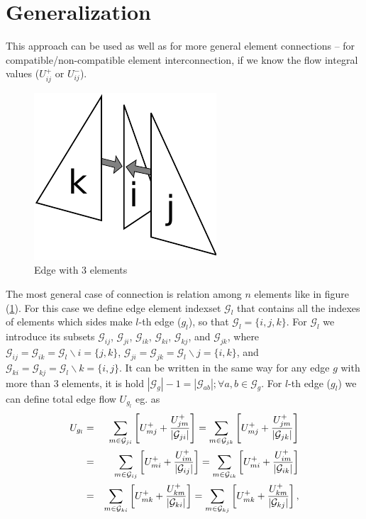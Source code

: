  \section*{Generalization}
  This approach can be used as well as for more general element connections -- for compatible/non-compatible element interconnection, if we know the flow integral
  values ($U_{ij}^{+}$ or $U_{ij}^{-}$). %
      \begin{figure}[h]
        \begin{center}
        \includegraphics[scale=0.7]{obr7.pdf} 
	\caption{Edge with 3 elements}
	\label{edgemodel}
        \end{center}
      \end{figure}  
  The most general case of connection is relation among $n$ elements like in figure (\ref{edgemodel}). For this case we define
edge element indexset $\mathcal{G}_{l}$ that contains all the indexes of elements which sides make $l$-th edge ($g_l$), so that $\mathcal{G}_{l} = \{i,j,k\}$.
For $\mathcal{G}_{l}$ we introduce its subsets $\mathcal{G}_{ij}$, $\mathcal{G}_{ji}$, $\mathcal{G}_{ik}$, $\mathcal{G}_{ki}$, $\mathcal{G}_{kj}$, and $\mathcal{G}_{jk}$,
  where $\mathcal{G}_{ij} = \mathcal{G}_{ik} =  \mathcal{G}_{l} \backslash {i} = \{j,k\}$, $ \mathcal{G}_{ji} = \mathcal{G}_{jk} = \mathcal{G}_{l} \backslash {j} =\{i,k\}$, and
 $\mathcal{G}_{ki} = \mathcal{G}_{kj} = \mathcal{G}_{l} \backslash {k} =\{i,j\}$. It can be written in the same way for any edge $g$ with more than 3 elements, 
it is hold  $|\mathcal{G}_{g}| - 1 = |\mathcal{G}_{ab}|; \forall a,b \in \mathcal{G}_{g}$.
For $l$-th edge ($g_l$) we can define total edge flow $U_{g_{l}}$ eg. as
  \begin{eqnarray}
   U_{g_{l}} &=& \sum\limits_{m \in \mathcal{G}_{ji}}   \left[ U_{mj}^{+}   + \frac{ U_{jm}^{+}}{|\mathcal{G}_{ji}|} \right] = \sum\limits_{m \in \mathcal{G}_{jk}}  \left[ U_{mj}^{+}   +  \frac{ U_{jm}^{+}}{|\mathcal{G}_{jk}|} \right] \notag \\
	      &=& \sum\limits_{m \in \mathcal{G}_{ij}}  \left[ U_{mi}^{+}   +  \frac{ U_{im}^{+}}{|\mathcal{G}_{ij}|} \right] = \sum\limits_{m \in \mathcal{G}_{ik}} \left[  U_{mi}^{+} +  \frac{ U_{im}^{+}}{|\mathcal{G}_{ik}|} \right] \notag \\ 
	      &=& \sum\limits_{m \in \mathcal{G}_{ki}}  \left[ U_{mk}^{+}   +  \frac{ U_{km}^{+}}{|\mathcal{G}_{ki}|} \right] = \sum\limits_{m \in \mathcal{G}_{kj}}  \left[ U_{mk}^{+}   +  \frac{ U_{km}^{+}}{|\mathcal{G}_{kj}|} \right], \label{edgeflow}
  \end{eqnarray}
